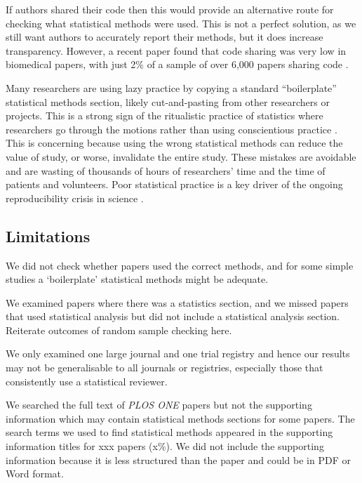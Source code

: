 \documentclass[12pt]{article}
\begin{document}
If authors shared their code then this would provide an alternative
route for checking what statistical methods were used. This is not a
perfect solution, as we still want authors to accurately report their
methods, but it does increase transparency. However, a recent paper
found that code sharing was very low in biomedical papers, with just 2\%
of a sample of over 6,000 papers sharing code \citep{Serghiou2021}.

Many researchers are using lazy practice by copying a standard
``boilerplate'' statistical methods section, likely cut-and-pasting from
other researchers or projects. This is a strong sign of the ritualistic
practice of statistics where researchers go through the motions rather
than using conscientious practice \citep{Stark2018}. This is concerning
because using the wrong statistical methods can reduce the value of
study, or worse, invalidate the entire study. These mistakes are
avoidable and are wasting of thousands of hours of researchers' time and
the time of patients and volunteers. Poor statistical practice is a key
driver of the ongoing reproducibility crisis in science
\citep{Ioannidis2014}.

\hypertarget{limitations}{%
\subsection{Limitations}\label{limitations}}

We did not check whether papers used the correct methods, and for some
simple studies a `boilerplate' statistical methods might be adequate.

We examined papers where there was a statistics section, and we missed
papers that used statistical analysis but did not include a statistical
analysis section. Reiterate outcomes of random sample checking here.

We only examined one large journal and one trial registry and hence our
results may not be generalisable to all journals or registries,
especially those that consistently use a statistical reviewer.

We searched the full text of \emph{PLOS ONE} papers but not the
supporting information which may contain statistical methods sections
for some papers. The search terms we used to find statistical methods
appeared in the supporting information titles for xxx papers (x\%). We
did not include the supporting information because it is less structured
than the paper and could be in PDF or Word format.



\end{document}
